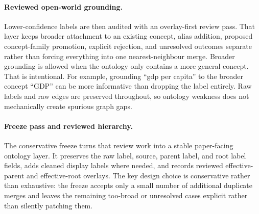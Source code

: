 \documentclass[11pt]{article}
\begin{document}
\paragraph{Reviewed open-world grounding.} Lower-confidence labels are then audited with an
overlay-first review pass. That layer keeps broader attachment to an existing concept, alias
addition, proposed concept-family promotion, explicit rejection, and unresolved outcomes
separate rather than forcing everything into one nearest-neighbour merge. Broader grounding
is allowed when the ontology only contains a more general concept. That is intentional. For
example, grounding ``gdp per capita'' to the broader concept ``GDP'' can be more
informative than dropping the label entirely. Raw labels and raw edges are preserved
throughout, so ontology weakness does not mechanically create spurious graph gaps.

\paragraph{Freeze pass and reviewed hierarchy.} The conservative freeze turns that review
work into a stable paper-facing ontology layer. It preserves the raw label, source, parent
label, and root label fields, adds cleaned display labels where needed, and records
reviewed effective-parent and effective-root overlays. The key design choice is conservative
rather than exhaustive: the freeze accepts only a small number of additional duplicate
merges and leaves the remaining too-broad or unresolved cases explicit rather than silently
patching them.
\end{document}
